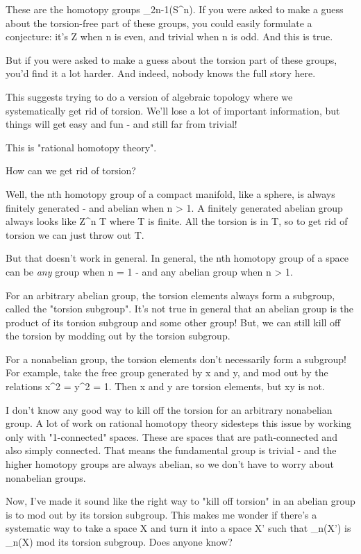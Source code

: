 These are the homotopy groups \pi _{2n-1}(S^{n}).  If
you were asked to make a guess about the torsion-free part of these
groups, you could easily formulate a conjecture: it's Z when n is
even, and trivial when n is odd.  And this is true.

But if you were asked to make a guess about the torsion part of these
groups, you'd find it a lot harder.  And indeed, nobody knows the full
story here.

This suggests trying to do a version of algebraic topology where we
systematically get rid of torsion.  We'll lose a lot of important
information, but things will get easy and fun - and still far from
trivial!

This is "rational homotopy theory".

How can we get rid of torsion?

Well, the nth homotopy group of a compact manifold, like a sphere, is
always finitely generated - and abelian when n > 1.  A finitely
generated abelian group always looks like Z^{n} \times  T
where T is finite.  All the torsion is in T, so to get rid of torsion
we can just throw out T.

But that doesn't work in general.  In general, the nth homotopy group 
of a space can be \emph{any} group when n = 1 - and any abelian group when 
n > 1.  

For an arbitrary abelian group, the torsion elements always form a 
subgroup, called the "torsion subgroup".   It's not true in general 
that an abelian group is the product of its torsion subgroup and 
some other group!  But, we can still kill off the torsion by modding
out by the torsion subgroup.

For a nonabelian group, the torsion elements don't necessarily form a
subgroup!  For example, take the free group generated by x and y, and
mod out by the relations x^{2} = y^{2} = 1.  Then x
and y are torsion elements, but xy is not.

I don't know any good way to kill off the torsion for an arbitrary
nonabelian group.  A lot of work on rational homotopy theory sidesteps
this issue by working only with "1-connected" spaces.  These are
spaces that are path-connected and also simply connected.  That means the
fundamental group is trivial - and the higher homotopy groups are
always abelian, so we don't have to worry about nonabelian groups.

Now, I've made it sound like the right way to "kill off
torsion" in an abelian group is to mod out by its torsion
subgroup.  This makes me wonder if there's a systematic way to take a
space X and turn it into a space X' such that \pi _{n}(X') is
\pi _{n}(X) mod its torsion subgroup.  Does anyone know?

